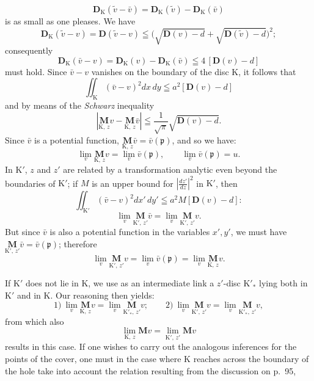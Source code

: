 \documentclass{article}
\begin{document}
\[ \mathbf{D}_{\mathrm{K}}(\tilde{v} - \bar{v}) = \mathbf{D}_{\mathrm{K}}(\tilde{v}) - \mathbf{D}_{\mathrm{K}}(\bar{v}) \]
is as small as one pleases. We have
\[ \mathbf{D}_{\mathrm{K}}(\tilde{v} - v) = \mathbf{D}(\tilde{v} - v) \leqq \bigl( \sqrt{\mathbf{D}(v) - d} + \sqrt{\mathbf{D}(\tilde{v}) - d} \bigr)^2; \]
consequently
\[ \mathbf{D}_{\mathrm{K}}(\bar{v} - v) = \mathbf{D}_{\mathrm{K}}(v) - \mathbf{D}_{\mathrm{K}}(\bar{v}) \leqq 4\,[\mathbf{D}(v) - d] \]
must hold. Since $\bar{v} - v$ vanishes on the boundary of the disc $\mathrm{K}$, it follows that
\[ \iint_{\mathrm{K}} (\bar{v} - v)^2 dx\,dy \leqq a^2 [\mathbf{D}(v) - d] \]
and by means of the \emph{Schwarz} inequality
\[ \left| \underset{\mathrm{K},\,z}{\mathbf{M}} v - \underset{\mathrm{K},\,z}{\mathbf{M}} \bar{v} \right| \leqq \frac{1}{\sqrt{\pi}} \sqrt{\mathbf{D}(v) - d}. \]
Since $\bar{v}$ is a potential function, $\underset{\mathrm{K},\,z}{\mathbf{M}} \bar{v} = \bar{v}(\mathfrak{p})$, and so we have:
\[ \lim_v \underset{\mathrm{K},\,z}{\mathbf{M}} v = \lim_v \bar{v}(\mathfrak{p}), \qquad \lim_v \bar{v}(\mathfrak{p}) = u. \]
In $\mathrm{K}'$, $z$ and $z'$ are related by a transformation analytic even beyond the boundaries of $\mathrm{K}'$; if $M$ is an upper bound for $\left|\frac{dz'}{dz}\right|^2$ in $\mathrm{K}'$, then
\[ \iint_{\mathrm{K}'} (\bar{v} - v)^2 dx'\,dy' \leqq a^2 M [\mathbf{D}(v) - d]\colon \]
\[ \lim_v \underset{\mathrm{K}',\,z'}{\mathbf{M}} \bar{v} = \lim_v \underset{\mathrm{K}',\,z'}{\mathbf{M}} v. \]
But since $\bar{v}$ is also a potential function in the variables $x', y'$, we must have $\underset{\mathrm{K}',\,z'}{\mathbf{M}} \bar{v} = \bar{v}(\mathfrak{p})$; therefore
\[ \lim_v \underset{\mathrm{K}',\,z'}{\mathbf{M}} v = \lim_v \bar{v}(\mathfrak{p}) = \lim_v \underset{\mathrm{K},\,z}{\mathbf{M}} v. \]

If $\mathrm{K}'$ does not lie in $\mathrm{K}$, we use as an intermediate link a $z'$-disc $\mathrm{K}'_*$ lying both in $\mathrm{K}'$ and in $\mathrm{K}$. Our reasoning then yields:
\[ \text{1)}\ \lim_v \underset{\mathrm{K},\,z}{\mathbf{M}} v = \lim_v \underset{\mathrm{K}'_*,\,z'}{\mathbf{M}} v; \qquad \text{2)}\ \lim_v \underset{\mathrm{K}',\,z'}{\mathbf{M}} v = \lim_v \underset{\mathrm{K}'_*,\,z'}{\mathbf{M}} v, \]
from which also
\[ \lim_{\mathrm{K},\,z} \mathbf{M} v = \lim_{\mathrm{K}',\,z'} \mathbf{M} v \]
results in this case. If one wishes to carry out the analogous inferences for the points of the cover, one must in the case where $\mathrm{K}$ reaches across the boundary of the hole take into account the relation resulting from the discussion on p.~95,
\end{document}
